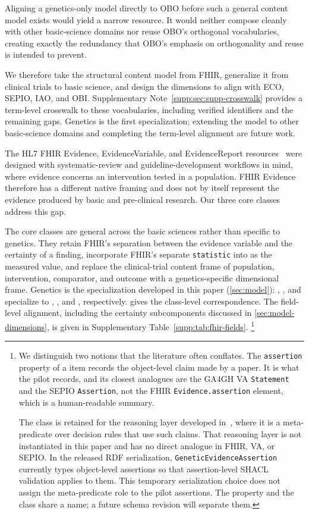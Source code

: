 Aligning a genetics-only model directly to OBO before such a general content
model exists would yield a narrow resource. It would neither compose cleanly
with other basic-science domains nor reuse OBO's orthogonal vocabularies,
creating exactly the redundancy that OBO's emphasis on orthogonality and
reuse is intended to prevent.

We therefore take the structural content model from FHIR, generalize it from
clinical trials to basic science, and design the dimensions to align with
ECO, SEPIO, IAO, and OBI. Supplementary Note~\ref*{supp:sec:supp-crosswalk} provides a term-level
crosswalk to these vocabularies, including verified identifiers and the
remaining gaps. Genetics is the first specialization; extending the model to
other basic-science domains and completing the term-level alignment are
future work.

The HL7 FHIR Evidence, EvidenceVariable, and EvidenceReport
resources~\cite{fhir_evidence} were designed with systematic-review and
guideline-development workflows in mind, where evidence concerns an
intervention tested in a population. FHIR Evidence therefore has a different native
framing and does not by itself represent the evidence produced by basic and
pre-clinical research. Our three core classes address this gap.

The core classes are general across the basic sciences rather than specific
to genetics. They retain FHIR's separation between the evidence variable and
the certainty of a finding, incorporate FHIR's separate \texttt{statistic}
into \EvidenceVariable{} as the measured value, and replace the
clinical-trial content frame of population, intervention, comparator, and
outcome with a genetics-specific dimensional frame. Genetics is the
specialization developed in this paper (\cref{sec:model}):
\ScientificEvidence{}, \EvidenceVariable{}, and \EvidenceAssertion{}
specialize to \GeneticEvidence{}, \GeneticEvidenceVariable{}, and
\GeneticEvidenceAssertion{}, respectively.  gives
the class-level correspondence. The field-level alignment, including the
certainty subcomponents discussed in \cref{sec:model-dimensions}, is given in
Supplementary Table~\ref*{supp:tab:fhir-fields}.%
\footnote{We distinguish two notions that the literature often conflates.
The \texttt{assertion} property of a \ScientificEvidence{} item records the
object-level claim made by a paper. It is what the pilot records, and its
closest analogues are the GA4GH VA \texttt{Statement} and the SEPIO
\texttt{Assertion}, not the FHIR \texttt{Evidence.assertion} element, which
is a human-readable summary.

The \EvidenceAssertion{} class is retained for the reasoning layer developed
in~\cite{our_preprint}, where it is a meta-predicate over decision rules that
use such claims. That reasoning layer is not instantiated in this paper and
has no direct analogue in FHIR, VA, or SEPIO. In the released RDF
serialization, \texttt{GeneticEvidenceAssertion} currently types
object-level assertions so that assertion-level SHACL validation applies to
them. This temporary serialization choice does not assign the
meta-predicate role to the pilot assertions. The property and the class
share a name; a future schema revision will separate them.}

